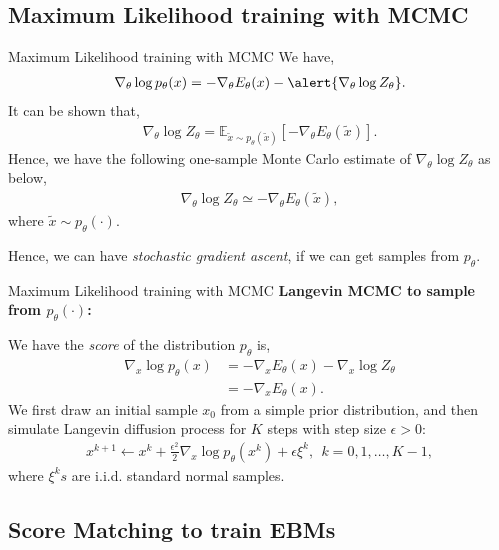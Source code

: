 \documentclass[aspectratio=169,xcolor=dvipsnames]{beamer}
\newcommand{\bE}{\mathbb{E}}
\newcommand{\te}{\theta}
\newcommand{\eps}{\epsilon}
\newcommand{\nal}[1]{\begin{align*}#1\end{align*}}
\begin{document}
\subsection{Maximum Likelihood training with MCMC}

\begin{frame}{Maximum Likelihood training with MCMC}
 We have,
 \nal{
     \nabla_{\te}\log p_{\te}(x) = -\nabla_{\te}E_{\te}(x) - \alert{\nabla_{\te}\log Z_{\te}}.
 }
 It can be shown that,
 \nal{
     \nabla_{\te}\log Z_{\te} = \bE_{\tilde{x}\sim p_{\te}(\tilde{x})}[-\nabla_{\te}E_{\te}(\tilde{x})].
 }
 Hence, we have the following one-sample Monte Carlo estimate of $\nabla_{\te}\log Z_{\te}$ as below,
 \nal{
    \nabla_{\te}\log Z_{\te} \simeq -\nabla_{\te} E_{\te}(\tilde{x}),
 }
 where $\tilde{x}\sim p_{\te}(\cdot)$.

 Hence, we can have \textit{stochastic gradient ascent}, \alert{if we can get samples from $p_{\te}$}.
\end{frame}


\begin{frame}{Maximum Likelihood training with MCMC}
 \textbf{Langevin MCMC to sample from $p_{\te}(\cdot)$:}
 
 We have the \textit{score} of the distribution $p_{\te}$ is,
 \nal{
      \nabla_x \log p_{\te}(x) & = -\nabla_{x} E_{\te}(x) -\nabla_x \log Z_{\te}\\
      & = -\nabla_{x} E_{\te}(x).
 }
 We first draw an initial
 sample $x_0$ from a simple prior distribution, and then simulate Langevin
 diffusion process for $K$ steps with step size $\eps >0$:
\nal{
    x^{k+1} \leftarrow x^k + \frac{\eps^2}{2}\nabla_x\log p_{\te}(x^k) + \eps\xi^k,~~k=0,1,\ldots,K-1,
}
where $\xi^k s$ are i.i.d. standard normal samples.
\end{frame}

\subsection{Score Matching to train EBMs}
\end{document}
